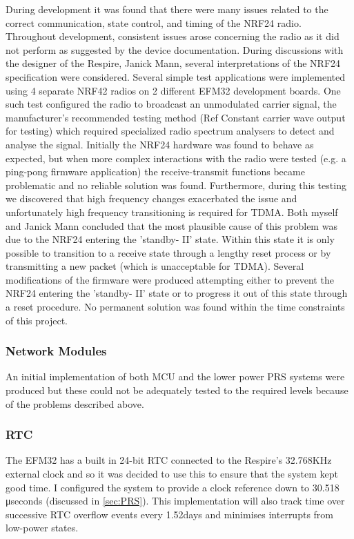During development it was found that there were many issues related to the correct
communication, state control, and timing of the \ac{NRF24} radio. Throughout development, consistent
issues arose concerning the radio as it did not perform as suggested by the device documentation.
During discussions with the designer of the Respire, Janick Mann, several interpretations of the
NRF24 specification were considered. Several simple test applications were implemented using 4
separate \ac{NRF42} radios on 2 different EFM32 development boards. One such test configured the
radio to broadcast an unmodulated carrier signal, the manufacturer’s recommended testing method
(Ref Constant carrier wave output for testing) which required specialized radio spectrum analysers
to detect and analyse the signal. Initially the \ac{NRF24} hardware was found to behave as expected, but
when more complex interactions with the radio were tested (e.g. a ping-pong firmware application)
the receive-transmit functions became problematic and no reliable solution was found.
Furthermore, during this testing we discovered that high frequency changes exacerbated the issue
and unfortunately high frequency transitioning is required for \ac{TDMA}. Both myself and Janick Mann
concluded that the most plausible cause of this problem was due to the \ac{NRF24} entering the
'standby- II' state. Within this state it is only possible to transition to a receive state through a
lengthy reset process or by transmitting a new packet (which is unacceptable for \ac{TDMA}). Several
modifications of the firmware were produced attempting either to prevent the \ac{NRF24} entering the
'standby- II' state or to progress it out of this state through a reset procedure. No permanent
solution was found within the time constraints of this project.


\subsubsection{Network Modules}
An initial implementation of both \ac{MCU} and the lower power \ac{PRS} systems were produced but these
could not be adequately tested to the required levels because of the problems described above.


\subsubsection{\acf{RTC}}
The EFM32 has a built in 24-bit \ac{RTC} connected to the Respire’s 32.768KHz external
clock and so it was decided to use this to ensure that the system kept good time. I configured the
system to provide a clock reference down to 30.518 μseconds (discussed in \ref{sec:PRS}). This
implementation will also track time over successive RTC overflow events every 1.52days and
minimises interrupts from low-power states.


